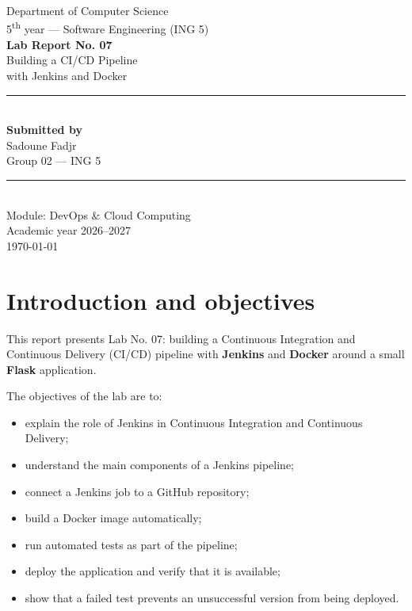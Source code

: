 \documentclass[11pt,a4paper]{article}
\begin{document}
\begin{titlepage}
\centering
\vspace*{1.2cm}
{\large Department of Computer Science}\\[0.3cm]
{\large 5\textsuperscript{th} year --- Software Engineering (ING 5)}\\[2.0cm]

{\Huge\bfseries Lab Report No. 07}\\[0.6cm]
{\LARGE Building a CI/CD Pipeline\\[0.2cm] with Jenkins and Docker}\\[2.2cm]

\rule{\linewidth}{0.4pt}\\[0.6cm]
{\large\bfseries Submitted by}\\[0.3cm]
{\Large Sadoune Fadjr}\\[0.3cm]
{\large Group 02 --- ING 5}\\[0.6cm]
\rule{\linewidth}{0.4pt}\\[2.0cm]

{\large Module: DevOps \& Cloud Computing}\\[3.0cm]

{\large Academic year 2026--2027}\\[0.3cm]
{\large \today}
\vfill
\end{titlepage}

\tableofcontents
\newpage

\section{Introduction and objectives}

This report presents Lab No. 07: building a Continuous Integration and Continuous
Delivery (CI/CD) pipeline with \textbf{Jenkins} and \textbf{Docker} around a small
\textbf{Flask} application.

The objectives of the lab are to:
\begin{itemize}[leftmargin=1.2cm]
  \item explain the role of Jenkins in Continuous Integration and Continuous Delivery;
  \item understand the main components of a Jenkins pipeline;
  \item connect a Jenkins job to a GitHub repository;
  \item build a Docker image automatically;
  \item run automated tests as part of the pipeline;
  \item deploy the application and verify that it is available;
  \item show that a failed test prevents an unsuccessful version from being deployed.
\end{itemize}
\end{document}
